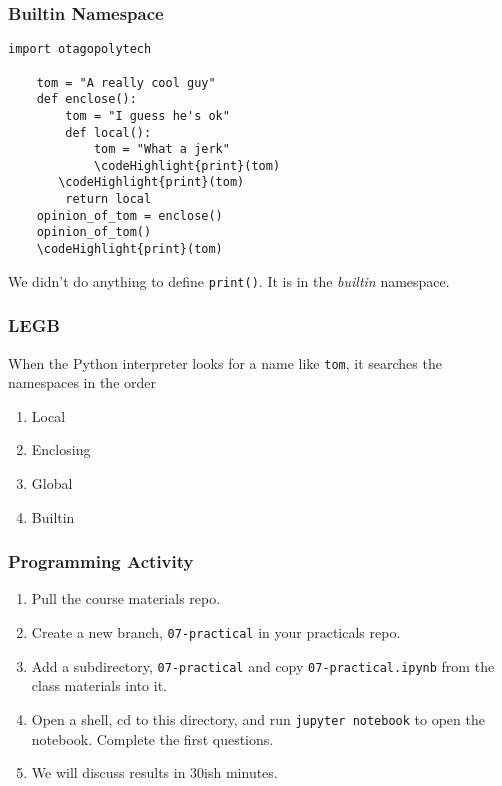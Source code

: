 \documentclass[10pt]{beamer}
\newcommand\codeHighlight[1]{\textcolor[rgb]{1,0,0}{\textbf{#1}}}
\begin{document}
\begin{frame}[fragile]
  \frametitle{Builtin Namespace}

  \begin{Verbatim}[commandchars=\\\{\}]
    import otagopolytech
    
    tom = "A really cool guy"
    def enclose():
        tom = "I guess he's ok"
        def local():
            tom = "What a jerk"
            \codeHighlight{print}(tom)
       \codeHighlight{print}(tom)
        return local        
    opinion_of_tom = enclose()
    opinion_of_tom()   
    \codeHighlight{print}(tom)
  \end{Verbatim}
  We didn't do anything to define \texttt{print()}. It is in the \emph{builtin} namespace.
\end{frame}

\begin{frame}
  \frametitle{LEGB}

  When the Python interpreter looks for a name like \texttt{tom}, it searches
  the namespaces in the order
  
  \begin{enumerate}
    \item Local
    \item Enclosing
    \item Global
    \item Builtin
  \end{enumerate}  
  
\end{frame}




\begin{frame}
  \frametitle{Programming Activity}
  
  \begin{enumerate}
    \item Pull the course materials repo.
    \item Create a new branch, \texttt{07-practical} in your practicals repo.
    \item Add a subdirectory,  \texttt{07-practical} and copy \texttt{07-practical.ipynb} from the class materials into it.
    \item Open a shell, cd to this directory, and run \texttt{jupyter notebook} to open the notebook. Complete the first questions.
    \item We will discuss results in 30ish minutes.
  \end{enumerate}      
\end{frame}
\end{document}
